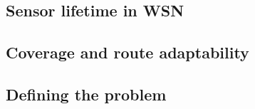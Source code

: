 \subsection{Sensor lifetime in WSN}

\subsection{Coverage and route adaptability}

\subsection{Defining the problem}
